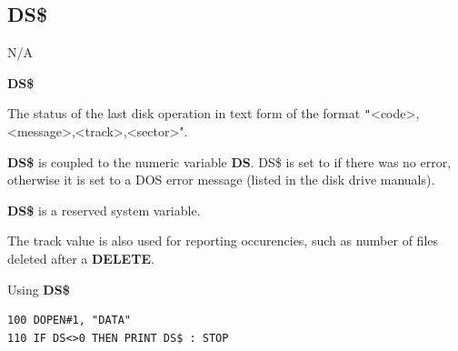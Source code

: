
\newpage
\subsection{DS\$}
\begin{description}[leftmargin=2cm,style=nextline]
\item [Token:]    N/A

\item [Format:]   {\bf DS\$}

\item [Usage:]    The status of the last disk operation in text form of the format {\texttt"<code>,<message>,<track>,<sector>"}.

                  {\bf DS\$} is coupled to the numeric variable {\bf DS}. DS\$ is set to  if there was no error, otherwise it is set to a DOS error message (listed in the disk drive manuals).

\item [Remarks:]  {\bf DS\$} is a reserved system variable.

                  The track value is also used for reporting occurencies, such as number of files deleted after a {\bf DELETE}.

\item [Example:]  Using {\bf DS\$}

\begin{tcolorbox}[colback=black,coltext=white]
\verbatimfont{\codefont}
\begin{verbatim}
100 DOPEN#1, "DATA"
110 IF DS<>0 THEN PRINT DS$ : STOP
\end{verbatim}
\end{tcolorbox}
\end{description}


\newpage
